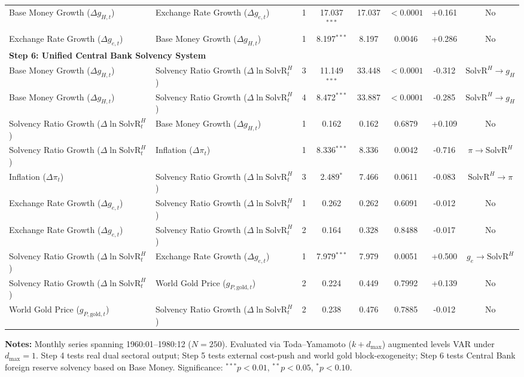 \begin{table}[htbp]
{\begin{tabular}{llcccccc}
Base Money Growth ($\Delta g_{H,t}$) & Exchange Rate Growth ($\Delta g_{e,t}$) & 1 & 17.037$^{***}$ & 17.037 & $< 0.0001$ & +0.161 & No \\
Exchange Rate Growth ($\Delta g_{e,t}$) & Base Money Growth ($\Delta g_{H,t}$) & 1 & 8.197$^{***}$ & 8.197 & 0.0046 & +0.286 & No \\
\multicolumn{8}{l}{\textbf{Step 6: Unified Central Bank Solvency System}} \\[0.15em]
Base Money Growth ($\Delta g_{H,t}$) & Solvency Ratio Growth ($\Delta \ln \text{SolvR}_t^H$) & 3 & 11.149$^{***}$ & 33.448 & $< 0.0001$ & -0.312 & $\text{SolvR}^H \to g_H$ \\
Base Money Growth ($\Delta g_{H,t}$) & Solvency Ratio Growth ($\Delta \ln \text{SolvR}_t^H$) & 4 & 8.472$^{***}$ & 33.887 & $< 0.0001$ & -0.285 & $\text{SolvR}^H \to g_H$ \\
Solvency Ratio Growth ($\Delta \ln \text{SolvR}_t^H$) & Base Money Growth ($\Delta g_{H,t}$) & 1 & 0.162 & 0.162 & 0.6879 & +0.109 & No \\
Solvency Ratio Growth ($\Delta \ln \text{SolvR}_t^H$) & Inflation ($\Delta \pi_t$) & 1 & 8.336$^{***}$ & 8.336 & 0.0042 & -0.716 & $\pi \to \text{SolvR}^H$ \\
Inflation ($\Delta \pi_t$) & Solvency Ratio Growth ($\Delta \ln \text{SolvR}_t^H$) & 3 & 2.489$^{*}$ & 7.466 & 0.0611 & -0.083 & $\text{SolvR}^H \to \pi$ \\
Exchange Rate Growth ($\Delta g_{e,t}$) & Solvency Ratio Growth ($\Delta \ln \text{SolvR}_t^H$) & 1 & 0.262 & 0.262 & 0.6091 & -0.012 & No \\
Exchange Rate Growth ($\Delta g_{e,t}$) & Solvency Ratio Growth ($\Delta \ln \text{SolvR}_t^H$) & 2 & 0.164 & 0.328 & 0.8488 & -0.017 & No \\
Solvency Ratio Growth ($\Delta \ln \text{SolvR}_t^H$) & Exchange Rate Growth ($\Delta g_{e,t}$) & 1 & 7.979$^{***}$ & 7.979 & 0.0051 & +0.500 & $g_e \to \text{SolvR}^H$ \\
Solvency Ratio Growth ($\Delta \ln \text{SolvR}_t^H$) & World Gold Price ($g_{P,\text{gold},t}$) & 2 & 0.224 & 0.449 & 0.7992 & +0.139 & No \\
World Gold Price ($g_{P,\text{gold},t}$) & Solvency Ratio Growth ($\Delta \ln \text{SolvR}_t^H$) & 2 & 0.238 & 0.476 & 0.7885 & -0.012 & No \\
\bottomrule
\end{tabular}%
}
\begin{minipage}{0.96\textwidth}
\vspace{0.3em}
\footnotesize \textbf{Notes:} Monthly series spanning 1960:01--1980:12 ($N=250$). Evaluated via Toda--Yamamoto ($k+d_{\max}$) augmented levels VAR under $d_{\max}=1$. Step 4 tests real dual sectoral output; Step 5 tests external cost-push and world gold block-exogeneity; Step 6 tests Central Bank foreign reserve solvency based on Base Money. Significance: $^{***} p < 0.01$, $^{**} p < 0.05$, $^{*} p < 0.10$.
\end{minipage}
\end{table}
